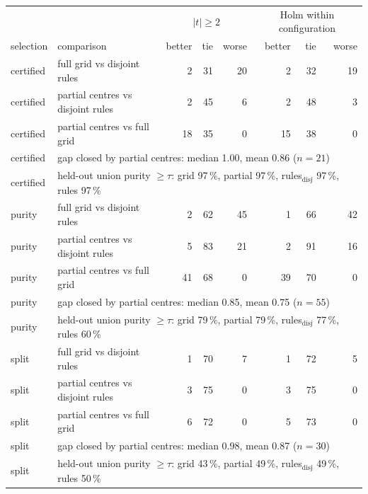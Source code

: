 \begin{tabular}{llrrrrrr}
\toprule
& & \multicolumn{3}{c}{$|t|\ge2$} & \multicolumn{3}{c}{Holm within configuration}\\
selection & comparison & better & tie & worse & better & tie & worse\\
\midrule
certified & full grid vs disjoint rules & 2 & 31 & 20 & 2 & 32 & 19\\
certified & partial centres vs disjoint rules & 2 & 45 & 6 & 2 & 48 & 3\\
certified & partial centres vs full grid & 18 & 35 & 0 & 15 & 38 & 0\\
certified & \multicolumn{7}{l}{gap closed by partial centres: median 1.00, mean 0.86 ($n=21$)}\\
certified & \multicolumn{7}{l}{held-out union purity $\ge\tau$: grid 97\,\%, partial 97\,\%, rules$_{\mathrm{disj}}$ 97\,\%, rules 97\,\%}\\
\midrule
purity & full grid vs disjoint rules & 2 & 62 & 45 & 1 & 66 & 42\\
purity & partial centres vs disjoint rules & 5 & 83 & 21 & 2 & 91 & 16\\
purity & partial centres vs full grid & 41 & 68 & 0 & 39 & 70 & 0\\
purity & \multicolumn{7}{l}{gap closed by partial centres: median 0.85, mean 0.75 ($n=55$)}\\
purity & \multicolumn{7}{l}{held-out union purity $\ge\tau$: grid 79\,\%, partial 79\,\%, rules$_{\mathrm{disj}}$ 77\,\%, rules 60\,\%}\\
\midrule
split & full grid vs disjoint rules & 1 & 70 & 7 & 1 & 72 & 5\\
split & partial centres vs disjoint rules & 3 & 75 & 0 & 3 & 75 & 0\\
split & partial centres vs full grid & 6 & 72 & 0 & 5 & 73 & 0\\
split & \multicolumn{7}{l}{gap closed by partial centres: median 0.98, mean 0.87 ($n=30$)}\\
split & \multicolumn{7}{l}{held-out union purity $\ge\tau$: grid 43\,\%, partial 49\,\%, rules$_{\mathrm{disj}}$ 49\,\%, rules 50\,\%}\\
\bottomrule
\end{tabular}
